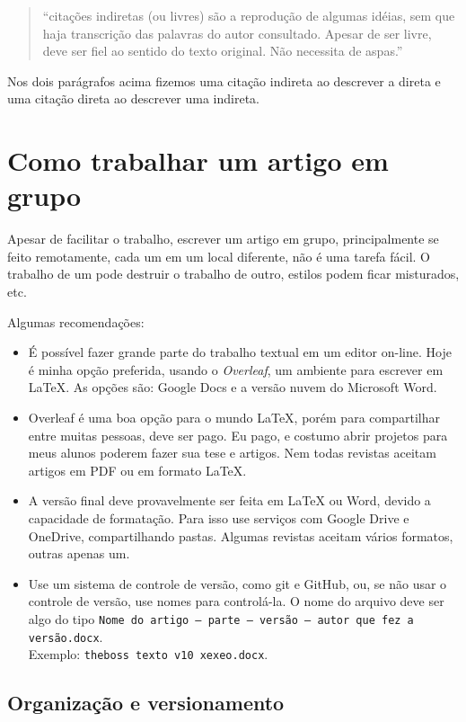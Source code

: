 \begin{quote}
``citações indiretas (ou livres) são a reprodução de algumas idéias, sem que haja transcrição das palavras do autor consultado. Apesar de ser livre, deve ser fiel ao sentido do texto original. Não necessita de aspas.'' \citep{abnt10520_2023}
\end{quote}

Nos dois parágrafos acima fizemos uma citação indireta ao descrever a direta e uma citação direta ao descrever uma indireta. 

 \section{Como trabalhar um artigo em grupo}

Apesar de facilitar o trabalho, escrever um artigo em grupo, principalmente se feito remotamente, cada um em um local diferente, não é uma tarefa fácil. O trabalho de um pode destruir o trabalho de outro, estilos podem ficar misturados, etc.

Algumas recomendações:

\begin{itemize}
  \item É possível fazer grande parte do trabalho textual em um editor on-line. Hoje é minha opção preferida, usando o \textit{Overleaf}, um ambiente para escrever em \LaTeX. As opções são: Google Docs e a versão nuvem do Microsoft Word. 
  \item Overleaf é uma boa opção para o mundo \LaTeX, porém para compartilhar entre muitas pessoas, deve ser pago. Eu pago, e costumo abrir projetos para meus alunos poderem fazer sua tese e artigos. Nem todas revistas aceitam artigos em PDF ou em formato \LaTeX.
  \item A versão final deve provavelmente ser feita em LaTeX ou Word, devido a capacidade de formatação. Para isso use serviços com Google Drive e OneDrive, compartilhando pastas. Algumas revistas aceitam vários formatos, outras apenas um.
  \item Use um sistema de controle de versão, como git e GitHub, ou, se não usar o controle de versão, use nomes para controlá-la. O nome do arquivo deve ser algo do tipo \texttt{Nome do artigo – parte – versão – autor que fez a versão.docx}.\\
  Exemplo: \texttt{theboss texto v10 xexeo.docx}. 
\end{itemize}

\subsection{Organização e versionamento}

